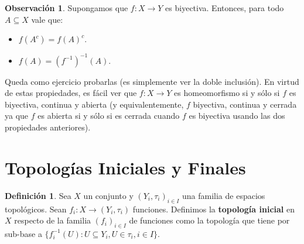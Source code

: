 \documentclass[12pt]{book}
\theoremstyle{definition}
\newtheorem{obs}[teo]{Observación}
\newtheorem{defn}[teo]{Definición}
\begin{document}
\begin{obs}
Supongamos que $f:X\to Y$ es biyectiva. Entonces, para todo $A\subseteq X$ vale que: \begin{itemize}\item $f(A^c) = f(A)^c$. \item $f(A) = (f^{-1})^{-1}(A)$. \end{itemize} Queda como ejercicio probarlas (es simplemente ver la doble inclusión). En virtud de estas propiedades, es fácil ver que $f:X\to Y$ es homeomorfismo si y sólo si $f$ es biyectiva, continua y abierta (y equivalentemente, $f$ biyectiva, continua y cerrada ya que $f$ es abierta si y sólo si es cerrada cuando $f$ es biyectiva usando las dos propiedades anteriores). 
\end{obs}

\section{Topologías Iniciales y Finales}

\begin{defn}
Sea $X$ un conjunto y $(Y_i,\tau_i)_{i\in I}$ una familia de espacios topológicos. Sean $f_i:X\to (Y_i,\tau_i)$ funciones. Definimos la \textbf{topología inicial} en $X$ respecto de la familia $(f_i)_{i\in I}$ de funciones como la topología que tiene por sub-base a $\{f_i^{-1}(U) : U\subseteq Y_i, U\in\tau_i, i\in I\}$.
\end{defn}
\end{document}
